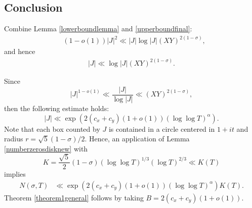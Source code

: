 \documentclass[reqno]{amsart}
\numberwithin{equation}{section}
\theoremstyle{remark}
\begin{document}
\subsection{Conclusion}
Combine Lemma \ref{lowerboundlemma} and \eqref{upperboundfinal}:
\begin{align*}
    &(1-o(1))|J|^2\ll |J|\log|J|(XY)^{2(1-\sigma)},
\end{align*}
and hence
\begin{align*}
    |J|\ll  \log|J|(XY)^{2(1-\sigma)}.
\end{align*}

Since
\[
|J|^{1-o(1)}\ll \frac{|J|}{\log |J|}\ll (XY)^{2(1-\sigma)},
\]
then the following estimate holds:
\begin{equation*}
    |J|\ll \exp(2(c_x+c_y)(1+o(1))(\log\log T)^\alpha).
\end{equation*}
Note that each box counted by $J$ is contained in a circle centered in $1+it$ and radius $r=\sqrt{5}(1-\sigma)/2$. Hence, an application of Lemma \ref{numberzerosdisknew} with 
\begin{equation*}
    K=\frac{\sqrt{5}}{2}(1-\sigma)(\log\log T)^{1/3}(\log T)^{2/3}\ll K(T)
\end{equation*}
implies
\begin{equation*}
\begin{aligned}
   N(\sigma,T)&\ll \exp(2(c_x+c_y)(1+o(1))(\log\log T)^\alpha)K(T).  
\end{aligned}
\end{equation*}
Theorem \ref{theorem1general} follows by taking $B=2(c_x+c_y)(1+o(1)).$
\end{document}
